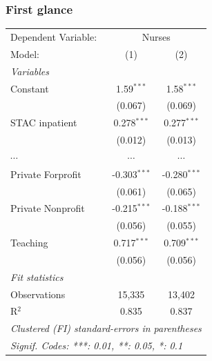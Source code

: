 \documentclass[10pt,mathserif,aspectratio=169]{beamer}
\begin{document}
\begin{frame}
  \frametitle{First glance}
  \begin{table}
    \fontsize{8pt}{8pt}\selectfont
    \begingroup
    \centering
    \begin{tabular}{lcc}
      \tabularnewline \midrule \midrule
      Dependent Variable: & \multicolumn{2}{c}{Nurses}                         \\
      Model:              & (1)                        & (2)                   \\
      \midrule
      \emph{Variables}                                                         \\
      Constant            & 1.59$^{***}$               & 1.58$^{***}$          \\
                          & (0.067)                    & (0.069)               \\
      STAC inpatient      & 0.278$^{***}$              & 0.277$^{***}$         \\
                          & (0.012)                    & (0.013)               \\
      $\cdots$            & $\cdots$                   & $\cdots$              \\
      Private Forprofit   & -0.303$^{***}$             & -0.280$^{***}$        \\
                          & (0.061)                    & (0.065)               \\
      Private Nonprofit   & -0.215$^{***}$             & -0.188$^{***}$        \\
                          & (0.056)                    & (0.055)               \\
      Teaching            & 0.717$^{***}$              & 0.709$^{***}$         \\
                          & (0.056)                    & (0.056)               \\
      \midrule
      \emph{Fit statistics}                                                    \\
      Observations        & 15,335                     & 13,402                \\
      R$^2$               & 0.835                      & 0.837                 \\
      \midrule \midrule
      \multicolumn{3}{l}{\emph{Clustered (FI) standard-errors in parentheses}} \\
      \multicolumn{3}{l}{\emph{Signif. Codes: ***: 0.01, **: 0.05, *: 0.1}}    \\
    \end{tabular}
    \par\endgroup
  \end{table}
\end{frame}
\end{document}
